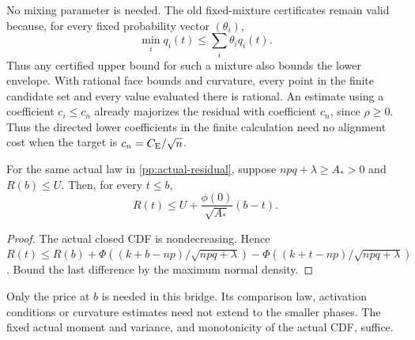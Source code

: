 No mixing parameter is needed. The old fixed-mixture certificates
remain valid because, for every fixed probability vector $(\theta_i)$,
\[
 \min_iq_i(t)\le\sum_i\theta_iq_i(t).
\]
Thus any certified upper bound for such a mixture also bounds the
lower envelope. With rational face bounds and curvature, every point
in the finite candidate set and every value evaluated there is rational.
An estimate using a coefficient $c_i\le c_n$ already majorizes
the residual with coefficient $c_n$, since $\rho\ge0$.
Thus the directed lower coefficients in the finite calculation need
no alignment cost when the target is $c_n=C_{\mathrm E}/\sqrt n$.

\begin{lemma}\label{pp:cdf-bridge}
For the same actual law in \eqref{pp:actual-residual}, suppose
$npq+\lambda\ge A_*>0$ and $R(b)\le U$. Then, for every $t\le b$,
\begin{equation}\label{pp:bridge-bound}
 R(t)\le U+\frac{\phi(0)}{\sqrt{A_*}}(b-t).
\end{equation}
\end{lemma}
\begin{proof}
The actual closed CDF is nondecreasing. Hence
$R(t)\le R(b)+\Phi((k+b-np)/\sqrt{npq+\lambda})
-\Phi((k+t-np)/\sqrt{npq+\lambda})$.
Bound the last difference by the maximum normal density.
\end{proof}

Only the price at $b$ is needed in this bridge. Its comparison
law, activation conditions or curvature estimates need not extend
to the smaller phases. The fixed actual moment and variance, and
monotonicity of the actual CDF, suffice.
